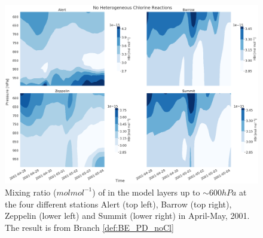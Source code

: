 \begin{figure}[ht]
    \centering
    \includegraphics[width = \linewidth]{Chapter6_Results/images/vertHBr_noCl.png}
    \caption{Mixing ratio ($mol mol^{-1}$) of  in the model layers up to $\sim 600 hPa$ at the four different stations Alert (top left), Barrow (top right), Zeppelin (lower left) and Summit (lower right) in April-May, 2001. The result is from Branch \ref{def:BE_PD_noCl}}
    \label{fig:vertHBr_noCl}
\end{figure}